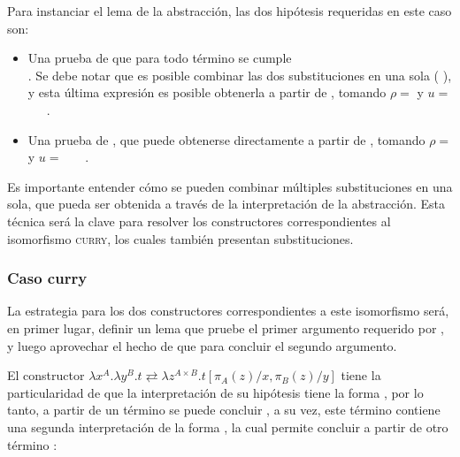 
Para instanciar el lema de la abstracción, las dos hipótesis requeridas en este caso son:
\begin{itemize}
	\item Una prueba de que para todo término \snstar {} se cumple \\
	\snstar
	.
	Se debe notar que es posible combinar las dos substituciones en una sola
	\snstar (\subst
	{\cons
		{\const{[}  \const{]≡} }
		{\parens{\comp{\ids}{\bound{$\rho$}}}}}
	{}), y esta última expresión es posible obtenerla a partir de , tomando $\rho =$ \bound{$\rho$} y $u =$ \const{[}~~\const{]≡}~.
	
	\item Una prueba de
	\snstar
	\subst
	{\cons
		{\const{[}  \const{]≡} }
		{}}
	{}, que puede obtenerse directamente a partir de , tomando $\rho =$  y $u =$ \const{[}~~\const{]≡}~.
\end{itemize}

Es importante entender cómo se pueden combinar múltiples substituciones en una sola, que pueda ser obtenida a través de la interpretación de la abstracción.
Esta técnica será la clave para resolver los constructores correspondientes al isomorfismo \textsc{curry}, los cuales también presentan substituciones.

\subsubsection{Caso curry}

La estrategia para los dos constructores correspondientes a este isomorfismo será, en primer lugar, definir un lema que pruebe el primer argumento requerido por , y luego aprovechar el hecho de que
  
para concluir el segundo argumento.

El constructor  $\lambda x^A. \lambda y^B. t \rightleftarrows \lambda z^{A \times B}. t[\pi_A(z)/x, \pi_B(z)/y]$ tiene la particularidad de que la interpretación de su hipótesis tiene la forma 
, por lo tanto, a partir de un término \snstar{} se puede concluir
\snstar{}
, a su vez, este término contiene una segunda interpretación de la forma
,
la cual permite concluir a partir de otro término \snstar{}:

